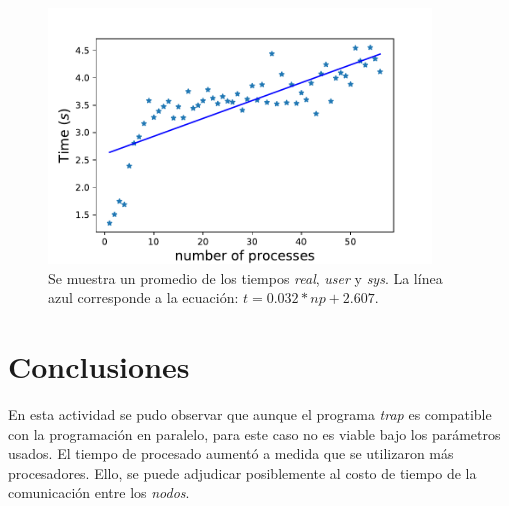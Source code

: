 \documentclass{article}
\begin{document}
\begin{figure}[h]
    \centering
    \includegraphics[width=4in]{timeProcesses2.pdf}
    \caption{Se muestra un promedio de los tiempos \textit{real}, \textit{user} y \textit{sys}. La línea azul corresponde a la ecuación: $t =0.032*np + 2.607$. } \label{fig2}
\end{figure}

\section{Conclusiones}
En esta actividad se pudo observar que aunque el programa \textit{trap} es compatible con la programación en paralelo, para este caso no es viable bajo los parámetros usados. El tiempo de procesado aumentó a medida que se utilizaron más procesadores. Ello, se puede adjudicar posiblemente al costo de tiempo de la comunicación entre los \textit{nodos}. 
\end{document}
